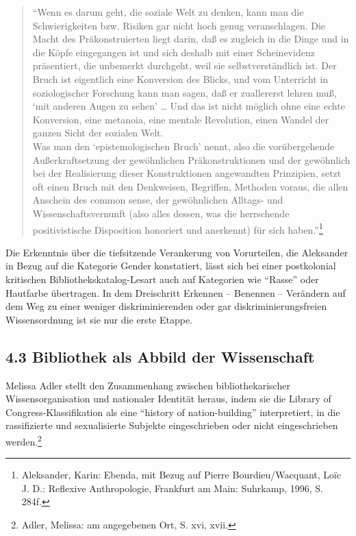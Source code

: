 \documentclass[a4paper,
fontsize=11pt,
oneside,
numbers=noperiodatend,
parskip=half-,
bibliography=totoc,
final
]{scrartcl}
\begin{document}
\begin{quote}
\enquote{Wenn es darum geht, die soziale Welt zu denken, kann man die
Schwierigkeiten bzw. Risiken gar nicht hoch genug veranschlagen. Die
Macht des Präkonstruierten liegt darin, daß es zugleich in die Dinge und
in die Köpfe eingegangen ist und sich deshalb mit einer Scheinevidenz
präsentiert, die unbemerkt durchgeht, weil sie selbstverständlich ist.
Der Bruch ist eigentlich eine Konversion des Blicks, und vom Unterricht
in soziologischer Forschung kann man sagen, daß er zuallererst lehren
muß, \enquote*{mit anderen Augen zu sehen} \ldots{} Und das ist nicht
möglich ohne eine echte Konversion, eine metanoia, eine mentale
Revolution, einen Wandel der ganzen Sicht der sozialen Welt.\\
Was man den \enquote*{epistemologischen Bruch} nennt, also die
vorübergehende Außerkraftsetzung der gewöhnlichen Präkonstruktionen und
der gewöhnlich bei der Realisierung dieser Konstruktionen angewandten
Prinzipien, setzt oft einen Bruch mit den Denkweisen, Begriffen,
Methoden voraus, die allen Anschein des common sense, der gewöhnlichen
Alltags- und Wissenschaftsvernunft (also alles dessen, was die
herrschende positivistische Disposition honoriert und anerkennt) für
sich haben.}\footnote{Aleksander, Karin: Ebenda, mit Bezug auf Pierre
  Bourdieu/Wacquant, Loïc J. D.: Reflexive Anthropologie, Frankfurt am
  Main: Suhrkamp, 1996, S. 284f.}
\end{quote}

Die Erkenntnis über die tiefsitzende Verankerung von Vorurteilen, die
Aleksander in Bezug auf die Kategorie Gender konstatiert, lässt sich bei
einer postkolonial kritischen Bibliothekskatalog-Lesart auch auf
Kategorien wie \enquote{Rasse} oder Hautfarbe übertragen. In dem
Dreischritt Erkennen -- Benennen -- Verändern auf dem Weg zu einer
weniger diskriminierenden oder gar diskriminierungsfreien Wissensordnung
ist sie nur die erste Etappe.

\hypertarget{bibliothek-als-abbild-der-wissenschaft}{%
\subsection{4.3 Bibliothek als Abbild der
Wissenschaft}\label{bibliothek-als-abbild-der-wissenschaft}}

Melissa Adler stellt den Zusammenhang zwischen bibliothekarischer
Wissensorganisation und nationaler Identität heraus, indem sie die
Library of Congress-Klassifikation als eine \enquote{history of
nation-building} interpretiert, in die rassifizierte und sexualisierte
Subjekte eingeschrieben oder nicht eingeschrieben werden.\footnote{Adler,
  Melissa: am angegebenen Ort, S. xvi, xvii.}
\end{document}

